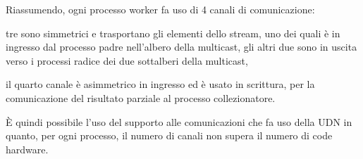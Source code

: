 Riassumendo, ogni processo worker fa uso di 4 canali di comunicazione: 
\begin{asparaitem}
\item tre sono simmetrici e trasportano gli elementi dello stream, uno dei quali \`e in ingresso dal processo padre nell'albero della multicast, gli altri due sono in uscita verso i processi radice dei due sottalberi della multicast, 
\item il quarto canale \`e asimmetrico in ingresso ed \`e usato in scrittura, per la comunicazione del risultato parziale al processo collezionatore.
\end{asparaitem}
\`E quindi possibile l'uso del supporto alle comunicazioni che fa uso della UDN in quanto, per ogni processo, il numero di canali non supera il numero di code hardware.
